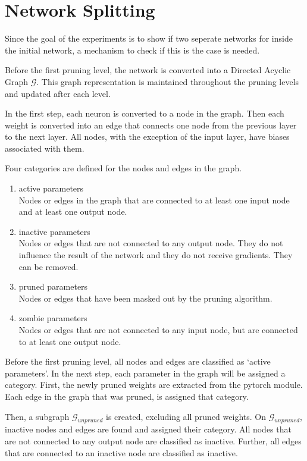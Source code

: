 \section{Network Splitting}
Since the goal of the experiments is to show if two seperate networks for inside the initial network, a mechanism to check if this is the case is needed.

Before the first pruning level, the network is converted into a Directed Acyclic Graph $\mathcal{G}$.
This graph representation is maintained throughout the pruning levels and updated after each level.

In the first step, each neuron is converted to a node in the graph.
Then each weight is converted into an edge that connects one node from the previous layer to the next layer.
All nodes, with the exception of the input layer, have biases associated with them.

Four categories are defined for the nodes and edges in the graph.
\begin{enumerate}
    \item active parameters  \\
    Nodes or edges in the graph that are connected to at least one input node and at least one output node.
    \item inactive parameters \\
    Nodes or edges that are not connected to any output node. They do not influence the result of the network and they do not receive gradients. They can be removed.
    \item pruned parameters \\
    Nodes or edges that have been masked out by the pruning algorithm.
    \item zombie parameters \\
    Nodes or edges that are not connected to any input node, but are connected to at least one output node.
\end{enumerate}
Before the first pruning level, all nodes and edges are classified as `active parameters'.
In the next step, each parameter in the graph will be assigned a category.
First, the newly pruned weights are extracted from the pytorch module.
Each edge in the graph that was pruned, is assigned that category.

Then, a subgraph $\mathcal{G}_{unpruned}$ is created, excluding all pruned weights.
On $\mathcal{G}_{unpruned}$, inactive nodes and edges are found and assigned their category.
All nodes that are not connected to any output node are classified as inactive.
Further, all edges that are connected to an inactive node are classified as inactive.

